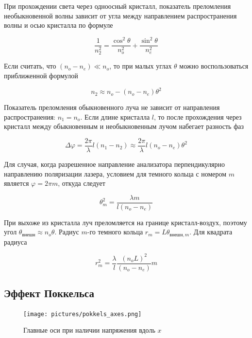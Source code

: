 \documentclass[a4paper,12pt]{article}
\begin{document}
При прохождении света через одноосный кристалл, показатель преломления необыкновенной
волны зависит от угла между направлением распространения волны и осью кристалла
по формуле

\begin{equation}
    \frac{1}{n_2^2} = \frac{\cos^2 \theta}{n_o^2} + \frac{\sin^2 \theta}{n_e^2}
    \label{eq:pokazatel_prelomlenia}
\end{equation}

Если считать, что $(n_o - n_e) \ll n_o$, то при малых углах $\theta$ можно
воспользоваться приближенной формулой

\begin{equation}
    n_2 \approx n_o - (n_o - n_e) \theta^2
    \label{eq:pokazatel_prelomlenia_approx}
\end{equation}

Показатель преломления обыкновенного луча не зависит от направления распространения:
$n_1 = n_o$. Если длине кристалла $l$, то после прохождения через кристалл между
обыкновенным и необыкновенным лучом набегает разность фаз

\begin{equation}
    \Delta \varphi = \frac{2\pi}{\lambda} l (n_1 - n_2) \approx
    \frac{2\pi}{\lambda} l (n_o - n_e) \theta^2
    \label{eq:raznost_faz}
\end{equation}

Для случая, когда разрешенное направление анализатора перпендикулярно направлению
поляризации лазера, условием для темного кольца с номером $m$ является
$\varphi = 2\pi m$, откуда следует

\begin{equation}
    \theta_m^2 = \frac{\lambda m}{l(n_o - n_e)}
    \label{eq:theta_m}
\end{equation}

При выхоже из кристалла луч преломляется на границе кристалл-воздух, поэтому угол
$\theta_{внешн} \approx n_o \theta$. Радиус $m$-го темного кольца
$r_m = L\theta_{внешн, m}$. Для квадрата радиуса

\begin{equation}
    r_m^2 = \frac{\lambda}{l} \frac{{(n_o L)}^2}{(n_o - n_e)} m
    \label{eq:r_m}
\end{equation}

\subsection{Эффект Поккельса}

\begin{figure}
  \begin{center}
    \texttt{[image: pictures/pokkels\_axes.png]}
  \end{center}
  \caption{Главные оси при наличии напряжения вдоль $x$}\label{fig:pokkels_axes}
\end{figure}
\end{document}
